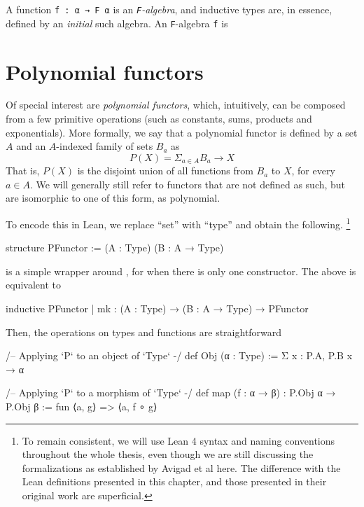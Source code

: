 \documentclass[titlepage]{report}
\newenvironment{remark}[1][Remark:]{\begin{trivlist}                         
    \item[\hskip \labelsep {\bfseries #1}]}{\end{trivlist}}
\newcommand\inductive{\lean{inductive}}
\begin{document}
A function \texttt{f : α → F α} is an \emph{\texttt{F}-algebra}, and inductive types are, in essence, defined by an \emph{initial} such algebra. An \texttt{F}-algebra \texttt{f} is 





\section{Polynomial functors}
Of special interest are \emph{polynomial functors}, which, intuitively, can be composed from a few primitive operations (such as constants, sums, products and exponentials).
More formally, we say that a polynomial functor is defined by a set $A$ and an $A$-indexed family of sets $B_a$ as
\[
    P(X) = \Sigma_{a ∈ A} B_a \rightarrow X  
\]
That is, $P(X)$ is the disjoint union of all functions from $B_a$ to $X$, for every $a ∈ A$.
We will generally still refer to functors that are not defined as such, but are isomorphic to one of this form, as polynomial.

To encode this in Lean, we replace ``set'' with ``type'' and obtain the following.
\footnote{To remain consistent, we will use Lean 4 syntax and naming conventions throughout the whole thesis, even though we are still discussing the formalizations as established by Avigad et al here. The difference with the Lean definitions presented in this chapter, and those presented in their original work are superficial.}
\begin{leancode}
    structure PFunctor := (A : Type) (B : A → Type)
\end{leancode}

\begin{remark}
     is a simple wrapper around \inductive, for when there is only one constructor.
    The above is equivalent to
    \begin{leancode}
        inductive PFunctor 
        | mk : (A : Type) → (B : A → Type) → PFunctor
    \end{leancode}
\end{remark}

Then, the operations on types and functions are straightforward
\begin{leancode}
    /-- Applying `P` to an object of `Type` -/
    def Obj (α : Type)
        := Σ x : P.A, P.B x → α

    /-- Applying `P` to a morphism of `Type` -/
    def map (f : α → β) : P.Obj α → P.Obj β :=
        fun ⟨a, g⟩ => ⟨a, f ∘ g⟩
\end{leancode}
\end{document}
